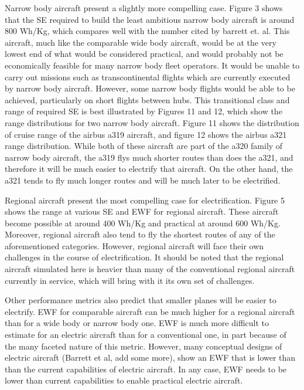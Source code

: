 Narrow body aircraft present a slightly more compelling case. Figure 3 shows that the SE required to build the least ambitious narrow body aircraft is around 800 Wh/Kg, which compares well with the number cited by barrett et. al. This aircraft, much like the comparable wide body aircraft, would be at the very lowest end of what would be considered practical, and would probably not be economically feasible for many narrow body fleet operators. It would be unable to carry out missions such as transcontinental flights which are currently executed by narrow body aircraft. However, some narrow body flights would be able to be achieved, particularly on short flights between hubs. This transitional class and range of required SE is best illustrated by Figures 11 and 12, which show the range distributions for two narrow body aircraft. Figure 11 shows the distribution of cruise range of the airbus a319 aircraft, and figure 12 shows the airbus a321 range distribution. While both of these aircraft are part of the a320 family of narrow body aircraft, the a319 flys much shorter routes than does the a321, and therefore it will be much easier to electrify that aircraft. On the other hand, the a321 tends to fly much longer routes and will be much later to be electrified.

Regional aircraft present the most compelling case for electrification. Figure 5 shows the range at various SE and EWF for regional aircraft. These aircraft become possible at around 400 Wh/Kg and practical at around 600 Wh/Kg. Moreover, regional aircraft also tend to fly the shortest routes of any of the aforementioned categories. However, regional aircraft will face their own challenges in the course of electrification. It should be noted that the regional aircraft simulated here is heavier than many of the conventional regional aircraft currently in service, which will bring with it its own set of challenges.  


Other performance metrics also predict that smaller planes will be easier to electrify. EWF for comparable aircraft can be much higher for a regional aircraft than for a wide body or narrow body one. EWF is much more difficult to estimate for an electric aircraft than for a conventional one, in part because of the many faceted nature of this metric. However, many conceptual designs of electric aircraft (Barrett et al, add some more), show an EWF that is lower than than the current capabilities of electric aircraft. In any case, EWF needs to be lower than current capabilities to enable practical electric aircraft. 

